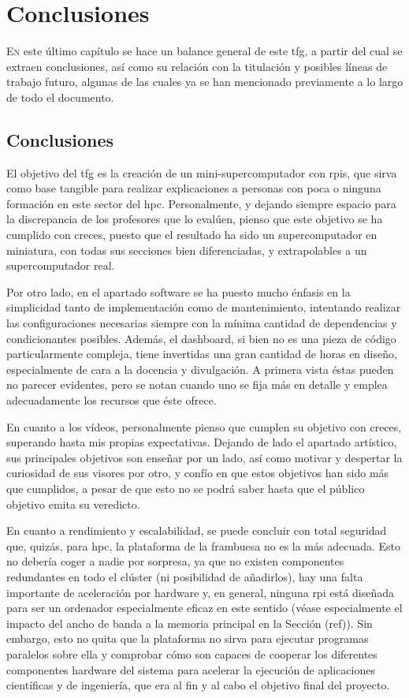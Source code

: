 \chapter{Conclusiones}
\label{chap:conclusiones}

\lettrine{E}{n} este último capítulo se hace un balance general de este \acrlong{tfg}, a partir del cual se extraen conclusiones, así como su relación con la titulación y posibles líneas de trabajo futuro, algunas de las cuales ya se han mencionado previamente a lo largo de todo el documento.

\section{Conclusiones}
El objetivo del \acrshort{tfg} es la creación de un mini-supercomputador con \acrlong{rpi}s, que sirva como base tangible para realizar explicaciones a personas con poca o ninguna formación en este sector del \acrshort{hpc}. Personalmente, y dejando siempre espacio para la discrepancia de los profesores que lo evalúen, pienso que este objetivo se ha cumplido con creces, puesto que el resultado ha sido un supercomputador en miniatura, con todas sus secciones bien diferenciadas, y extrapolables a un supercomputador real. 

Por otro lado, en el apartado software se ha puesto mucho énfasis en la simplicidad tanto de implementación como de mantenimiento, intentando realizar las configuraciones necesarias siempre con la mínima cantidad de dependencias y condicionantes posibles. Además, el dashboard, si bien no es una pieza de código particularmente compleja, tiene invertidas una gran cantidad de horas en diseño, especialmente de cara a la docencia y divulgación. A primera vista éstas pueden no parecer evidentes, pero se notan cuando uno se fija más en detalle y emplea adecuadamente los recursos que éste ofrece.

En cuanto a los vídeos, personalmente pienso que cumplen su objetivo con creces, superando hasta mis propias expectativas. Dejando de lado el apartado artístico, sus principales objetivos son enseñar por un lado, así como motivar y despertar la curiosidad de sus visores por otro, y confío en que estos objetivos han sido más que cumplidos, a pesar de que esto no se podrá saber hasta que el público objetivo emita su veredicto.

En cuanto a rendimiento y escalabilidad, se puede concluir con total seguridad que, quizás, para \acrshort{hpc}, la plataforma de la frambuesa no es la más adecuada. Esto no debería coger a nadie por sorpresa, ya que no existen componentes redundantes en todo el clúster (ni posibilidad de añadirlos), hay una falta importante de aceleración por hardware y, en general, ninguna \acrlong{rpi} está diseñada para ser un ordenador especialmente eficaz en este sentido (véase especialmente el impacto del ancho de banda a la memoria principal en la Sección (ref)). Sin embargo, esto no quita que la plataforma no sirva para ejecutar programas paralelos sobre ella y comprobar cómo son capaces de cooperar los diferentes componentes hardware del sistema para acelerar la ejecución de aplicaciones científicas y de ingeniería, que era al fin y al cabo el objetivo final del proyecto.

